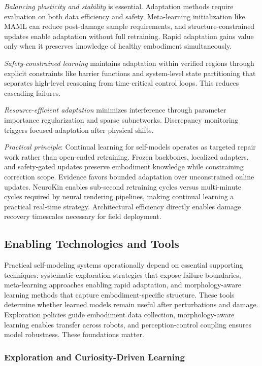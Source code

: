 ﻿\documentclass[11pt,a4paper]{article}
\begin{document}
\emph{Balancing plasticity and stability} is essential. Adaptation methods require evaluation on both data efficiency and safety. Meta-learning initialization like MAML can reduce post-damage sample requirements, and structure-constrained updates enable adaptation without full retraining. Rapid adaptation gains value only when it preserves knowledge of healthy embodiment simultaneously.

\emph{Safety-constrained learning} maintains adaptation within verified regions through explicit constraints like barrier functions and system-level state partitioning that separates high-level reasoning from time-critical control loops. This reduces cascading failures.

\emph{Resource-efficient adaptation} minimizes interference through parameter importance regularization and sparse subnetworks. Discrepancy monitoring triggers focused adaptation after physical shifts.

\emph{Practical principle}: Continual learning for self-models operates as targeted repair work rather than open-ended retraining. Frozen backbones, localized adapters, and safety-gated updates preserve embodiment knowledge while constraining correction scope. Evidence favors bounded adaptation over unconstrained online updates. NeuroKin enables sub-second retraining cycles versus multi-minute cycles required by neural rendering pipelines, making continual learning a practical real-time strategy. Architectural efficiency directly enables damage recovery timescales necessary for field deployment.

\subsection{Enabling Technologies and Tools}

Practical self-modeling systems operationally depend on essential supporting techniques: systematic exploration strategies that expose failure boundaries, meta-learning approaches enabling rapid adaptation, and morphology-aware learning methods that capture embodiment-specific structure. These tools determine whether learned models remain useful after perturbations and damage. Exploration policies guide embodiment data collection, morphology-aware learning enables transfer across robots, and perception-control coupling ensures model robustness. These foundations matter.

\subsubsection{Exploration and Curiosity-Driven Learning}
\end{document}
